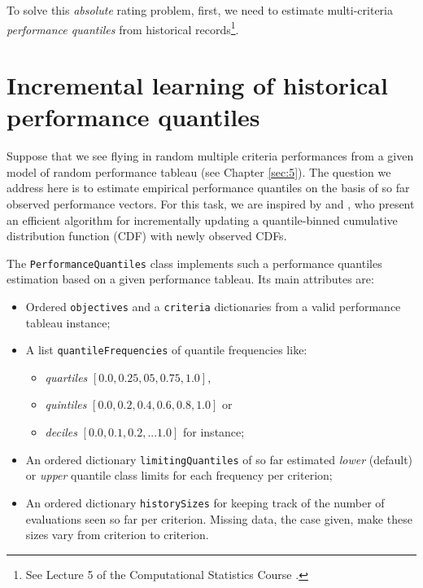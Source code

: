 To solve this \emph{absolute} rating problem, first, we need to estimate multi-criteria \emph{performance quantiles} from historical records\footnote{See Lecture 5 of the Computational Statistics Course \citep{CPSTAT-L5}.}.  

\section{Incremental learning of historical performance quantiles}
\label{sec:10.2}

Suppose that we see flying in random multiple criteria performances from a given model of random performance tableau (see Chapter \ref{sec:5}). The question we address here is to estimate empirical performance quantiles on the basis of so far observed performance vectors. For this task, we are inspired by \citep{CHAM-2006} and \citep{NR3-2007}, who present an efficient algorithm for incrementally updating a quantile-binned cumulative distribution function (CDF) with newly observed CDFs.

The \texttt{PerformanceQuantiles} class implements such a performance quantiles estimation based on a given performance tableau. Its main attributes are:
\begin{itemize}[rightmargin=0.5cm,leftmargin=0.5cm]
\item Ordered \texttt{objectives} and a \texttt{criteria} dictionaries from a valid performance tableau instance;
\item A list \texttt{quantileFrequencies} of quantile frequencies like:
  \begin{itemize}[nosep]
  \item \emph{quartiles} $[0.0, 0.25, 05, 0.75,1.0]$,
  \item  \emph{quintiles} $[0.0, 0.2, 0.4, 0.6, 0.8, 1.0]$ or
  \item  \emph{deciles} $[0.0, 0.1, 0.2, ... 1.0]$ for instance;
  \end{itemize}
\item An ordered  dictionary \texttt{limitingQuantiles} of so far estimated \emph{lower} (default) or \emph{upper} quantile class limits for each frequency per criterion;
\item An ordered dictionary \texttt{historySizes} for keeping track of the number of evaluations seen so far per criterion. Missing data, the case given, make these sizes vary from criterion to criterion.
\end{itemize}

